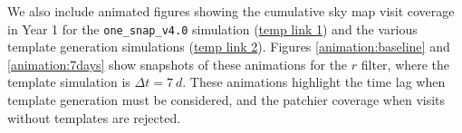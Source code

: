\documentclass[preprintm,linenumbers]{aastex631}
\newcommand{\baseline}{\texttt{one\_snap\_v4.0}\xspace}
\begin{document}
		We also include animated figures showing the cumulative sky map visit coverage in Year 1 for the \baseline simulation (\href{https://cuillin.roe.ac.uk/~jrobinson/LSST-Incremental-Templates-Analysis-Paper_4_0/first_year_one_snap_v4_0_10yrs_db_noDD_noTwi_tscale-7_nside-256_CountMetric_r_and_night_lt_365_and_scheduler_note_not_like_DD_and_scheduler_note_not_like_twilight_HEAL.mp4}{temp link 1}) and the various template generation simulations (\href{https://cuillin.roe.ac.uk/~jrobinson/LSST-Incremental-Templates-Analysis-Paper_4_0/first_year_one_snap_v4_0_10yrs_db_noDD_noTwi_tscale-7_nside-256_doAllTemplateMetrics_reduceCount_r_and_night_lt_365_and_scheduler_note_not_like_DD_and_scheduler_note_not_like_twilight_HEAL.mp4}{temp link 2}). 
  Figures \ref{animation:baseline} and \ref{animation:7days} show snapshots of these animations for the $r$ filter, where the template simulation is $\Delta t = 7\ \si{d}$.
		These animations highlight the time lag when template generation must be considered, and the patchier coverage when visits without templates are rejected.
		
\end{document}
